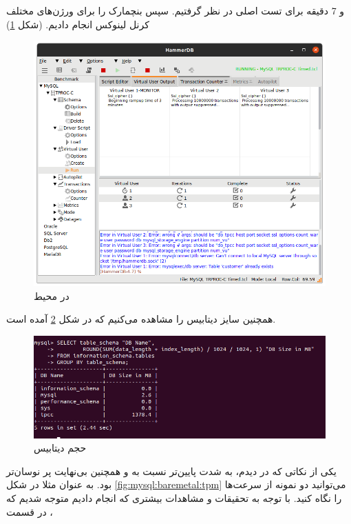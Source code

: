 و 7 دقیقه برای تست اصلی در نظر گرفتیم. سپس بنچمارک را برای ورژن‌های مختلف کرنل لینوکس انجام دادیم.
(شکل \ref{fig:mysql:baremetal:benchmark})
\begin{figure}[H]
    \centering
    \includegraphics[scale=0.5]{pictures/mysql/baremetal/benchmark-1.png}
    \caption{ در محیط }
    \label{fig:mysql:baremetal:benchmark}
\end{figure}
همچنین سایز دیتابیس را مشاهده می‌کنیم که در شکل
\ref{fig:mysql:baremetal:dbsize}
آمده است.
\begin{figure}[H]
    \centering
    \includegraphics[scale=0.5]{pictures/mysql/baremetal/db-size.png}
    \caption{حجم دیتابیس}
    \label{fig:mysql:baremetal:dbsize}
\end{figure}
یکی از نکاتی که در
دیدم،
به شدت پایین‌تر نسبت به
و همچنین بی‌نهایت پر نوسان‌تر بود. به عنوان مثلا در شکل
\ref{fig:mysql:baremetal:tpm}
می‌توانید دو نمونه از سرعت‌ها را نگاه کنید. با توجه به تحقیقات و مشاهدات بیشتری که انجام دادیم متوجه
شدیم که در قسمت
، 
